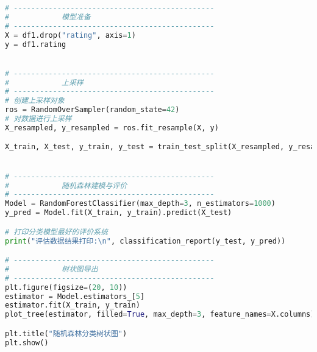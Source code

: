 \begin{lstlisting}[language=Python]
# ----------------------------------------------
#            模型准备
# ----------------------------------------------
X = df1.drop("rating", axis=1)
y = df1.rating


# ----------------------------------------------
#            上采样
# ----------------------------------------------
# 创建上采样对象
ros = RandomOverSampler(random_state=42)
# 对数据进行上采样
X_resampled, y_resampled = ros.fit_resample(X, y)

X_train, X_test, y_train, y_test = train_test_split(X_resampled, y_resampled, test_size=0.2, random_state=0)


# ----------------------------------------------
#            随机森林建模与评价
# ----------------------------------------------
Model = RandomForestClassifier(max_depth=3, n_estimators=1000)
y_pred = Model.fit(X_train, y_train).predict(X_test)

# 打印分类模型最好的评价系统
print("评估数据结果打印:\n", classification_report(y_test, y_pred))

# ----------------------------------------------
#            树状图导出
# ----------------------------------------------
plt.figure(figsize=(20, 10))
estimator = Model.estimators_[5]
estimator.fit(X_train, y_train)
plot_tree(estimator, filled=True, max_depth=3, feature_names=X.columns)

plt.title("随机森林分类树状图")
plt.show()
\end{lstlisting}

